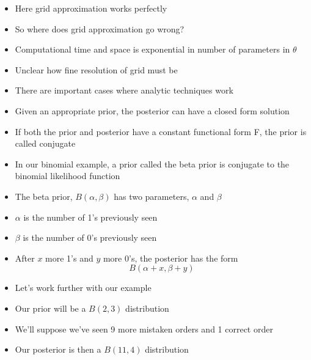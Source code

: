 \documentclass{beamer}
\begin{document}
\frame
{
  \begin{itemize}
    \item{Here grid approximation works perfectly}
    \item{So where does grid approximation go wrong?}
    \item{Computational time and space is exponential in number of parameters in $\theta$}
    \item{Unclear how fine resolution of grid must be}
  \end{itemize}
}

\frame
{
  \begin{itemize}
    \item{There are important cases where analytic techniques work}
    \item{Given an appropriate prior, the posterior can have a closed form solution}
    \item{If both the prior and posterior have a constant functional form F, the prior is called conjugate}
  \end{itemize}
}

\frame
{
  \begin{itemize}
    \item{In our binomial example, a prior called the beta prior is conjugate to the binomial likelihood function}
    \item{The beta prior, $B(\alpha, \beta)$ has two parameters, $\alpha$ and $\beta$}
    \item{$\alpha$ is the number of 1's previously seen}
    \item{$\beta$ is the number of 0's previously seen}
    \item{After $x$ more 1's and $y$ more 0's, the posterior has the form}
    \[
      B(\alpha + x, \beta + y)
    \]
  \end{itemize}
}

\frame
{
  \begin{itemize}
    \item{Let's work further with our example}
    \item{Our prior will be a $B(2, 3)$ distribution}
    \item{We'll suppose we've seen 9 more mistaken orders and 1 correct order}
    \item{Our posterior is then a $B(11, 4)$ distribution}
  \end{itemize}
}
\end{document}
